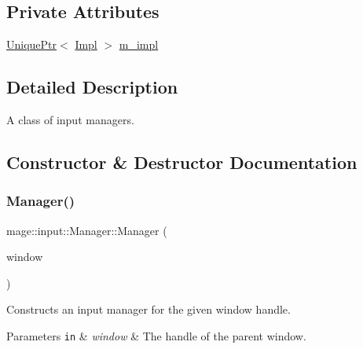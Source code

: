 \subsection*{Private Attributes}
\begin{DoxyCompactItemize}
\item 
\mbox{\hyperlink{namespacemage_a3316d7143a973e37adf1110f2e80ca31}{Unique\+Ptr}}$<$ \mbox{\hyperlink{classmage_1_1input_1_1_manager_1_1_impl}{Impl}} $>$ \mbox{\hyperlink{classmage_1_1input_1_1_manager_ae404d608b787f264c0d5e8cf24aacf98}{m\+\_\+impl}}
\end{DoxyCompactItemize}


\subsection{Detailed Description}
A class of input managers. 

\subsection{Constructor \& Destructor Documentation}
\mbox{\label{classmage_1_1input_1_1_manager_a58ecd18389d84fb46109f3b28d105879}} 
\subsubsection{\texorpdfstring{Manager()}{Manager()}\hspace{0.1cm}{\footnotesize\ttfamily [1/3]}}
{\footnotesize\ttfamily mage\+::input\+::\+Manager\+::\+Manager (\begin{DoxyParamCaption}\item[{\mbox{\hyperlink{namespacemage_a8769f9d670d6b585ea306cb1062af94b}{Not\+Null}}$<$ H\+W\+ND $>$}]{window }\end{DoxyParamCaption})\hspace{0.3cm}{\ttfamily [explicit]}}

Constructs an input manager for the given window handle.


\begin{DoxyParams}[1]{Parameters}
\mbox{\tt in}  & {\em window} & The handle of the parent window. \\
\hline
\end{DoxyParams}

